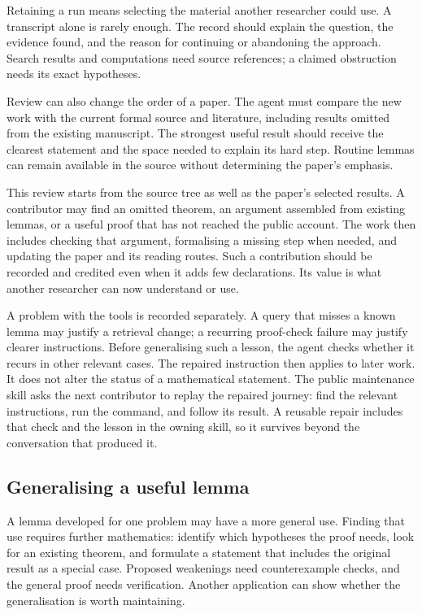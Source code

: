 \documentclass[10pt]{article}
\begin{document}
Retaining a run means selecting the material another researcher could use.
A transcript alone is rarely enough. The record should explain the question,
the evidence found, and the reason for continuing or abandoning the approach.
Search results and computations need source references; a claimed obstruction
needs its exact hypotheses.

Review can also change the order of a paper. The agent must compare the new
work with the current formal source and literature, including results omitted
from the existing manuscript. The strongest useful result should receive the
clearest statement and the space needed to explain its hard step. Routine
lemmas can remain available in the source without determining the paper's
emphasis.

This review starts from the source tree as well as the paper's selected
results. A contributor may find an omitted theorem, an argument assembled
from existing lemmas, or a useful proof that has not reached the public account.
The work then includes checking that argument, formalising a missing step when
needed, and updating the paper and its reading routes. Such a contribution
should be recorded and credited even when it adds few declarations. Its value
is what another researcher can now understand or use.

A problem with the tools is recorded separately. A query that misses a known
lemma may justify a retrieval change; a recurring proof-check failure may
justify clearer instructions. Before generalising such a lesson, the agent
checks whether it recurs in other relevant cases. The repaired instruction
then applies to later work. It does not alter the status of a mathematical
statement. The public maintenance skill asks the next contributor to replay
the repaired journey: find the relevant instructions, run the command, and
follow its result. A reusable repair includes that check and the lesson in the
owning skill, so it survives beyond the conversation that produced it.

\subsection{Generalising a useful lemma}\label{sec:local-to-general}

A lemma developed for one problem may have a more general use. Finding that
use requires further mathematics: identify which hypotheses the proof needs,
look for an existing theorem, and formulate a statement that includes the
original result as a special case. Proposed weakenings need counterexample
checks, and the general proof needs verification. Another application can
show whether the generalisation is worth maintaining.
\end{document}
